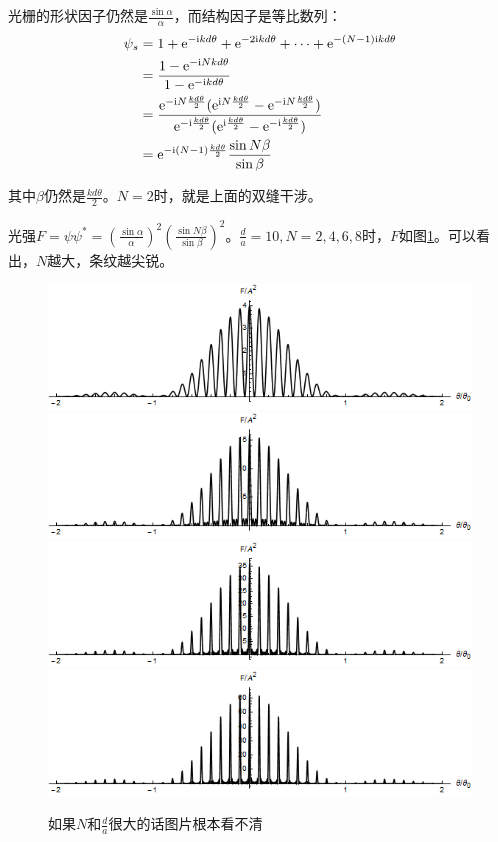 光栅的形状因子仍然是$\frac{\sin \alpha}{\alpha}$，而结构因子是等比数列：
\begin{align*}
\psi_s&=1+\mathrm{e}^{-\mathrm{i} k d \theta}+\mathrm{e}^{-2 \mathrm{i} k d \theta}+\dots+\mathrm{e}^{-(N-1) \mathrm{i} k d \theta} \\
&=\frac{1-\mathrm{e}^{-\mathrm{i} N k d \theta}}{1-\mathrm{e}^{-\mathrm{i} k d \theta}} \\
&=\frac{\mathrm{e}^{-\mathrm{i} N \frac{k d \theta}{2}} (\mathrm{e}^{\mathrm{i} N \frac{k d \theta}{2}}-\mathrm{e}^{-\mathrm{i} N \frac{k d \theta}{2}})}{\mathrm{e}^{-\mathrm{i} \frac{k d \theta}{2}} (\mathrm{e}^{\mathrm{i} \frac{k d \theta}{2}}-\mathrm{e}^{-\mathrm{i} \frac{k d \theta}{2}})} \\
&=\mathrm{e}^{-\mathrm{i} (N-1) \frac{k d \theta}{2}} \frac{\sin N \beta}{\sin \beta}
\end{align*}

其中$\beta$仍然是$\frac{k d \theta}{2}$。$N=2$时，就是上面的双缝干涉。

光强$F=\psi \psi^*=(\frac{\sin \alpha}{\alpha})^2 (\frac{\sin N \beta}{\sin \beta})^2$。$\frac{d}{a}=10,N=2,4,6,8$时，$F$如图\ref{fig-grate}。可以看出，$N$越大，条纹越尖锐。
\begin{figure}[htb]
\centering
\includegraphics[scale=0.3]{fig/grate-2.png}
\includegraphics[scale=0.3]{fig/grate-4.png} \\
\includegraphics[scale=0.3]{fig/grate-6.png}
\includegraphics[scale=0.3]{fig/grate-8.png}
\caption{如果$N$和$\frac{d}{a}$很大的话图片根本看不清}
\label{fig-grate}
\end{figure}

